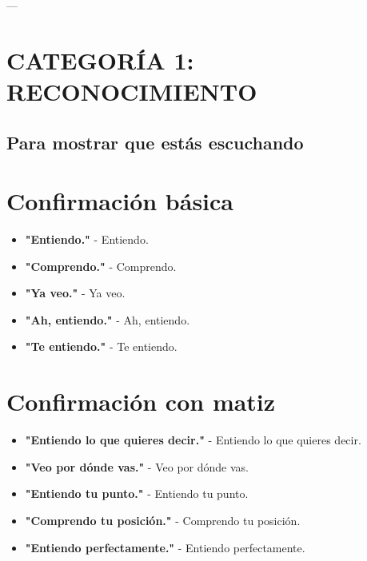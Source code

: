 \documentclass[a4paper,11pt]{article}
\begin{document}
\vspace{0.2cm}

---

\vspace{0.2cm}

\section{CATEGORÍA 1: RECONOCIMIENTO}

\vspace{0.2cm}

\subsection{Para mostrar que estás escuchando}

\vspace{0.2cm}

\section{Confirmación básica}

\begin{itemize}

  \item \textbf{"Entiendo."} - Entiendo.

  \item \textbf{"Comprendo."} - Comprendo.

  \item \textbf{"Ya veo."} - Ya veo.

  \item \textbf{"Ah, entiendo."} - Ah, entiendo.

  \item \textbf{"Te entiendo."} - Te entiendo.

\end{itemize}

\vspace{0.2cm}

\section{Confirmación con matiz}

\begin{itemize}

  \item \textbf{"Entiendo lo que quieres decir."} - Entiendo lo que quieres decir.

  \item \textbf{"Veo por dónde vas."} - Veo por dónde vas.

  \item \textbf{"Entiendo tu punto."} - Entiendo tu punto.

  \item \textbf{"Comprendo tu posición."} - Comprendo tu posición.

  \item \textbf{"Entiendo perfectamente."} - Entiendo perfectamente.

\end{itemize}
\end{document}
